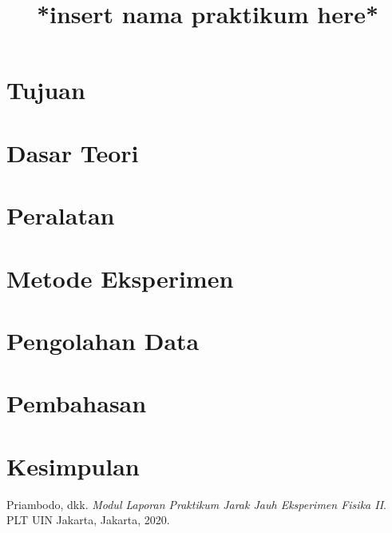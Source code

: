 \documentclass{article}
\title{*insert nama praktikum here*}
\date{}
\author{}
\begin{document}
	\maketitle
	
	\section{Tujuan}
	
	\section{Dasar Teori}
	 
	\section{Peralatan}

	\section{Metode Eksperimen}

	\section{Pengolahan Data}
	
	\section{Pembahasan}

	\section{Kesimpulan}

	\begin{thebibliography}{9}
		Priambodo, dkk. 
		\textit{Modul Laporan Praktikum Jarak Jauh Eksperimen Fisika II}. 
		PLT UIN Jakarta, Jakarta, 2020.
	\end{thebibliography}
	
\end{document}
